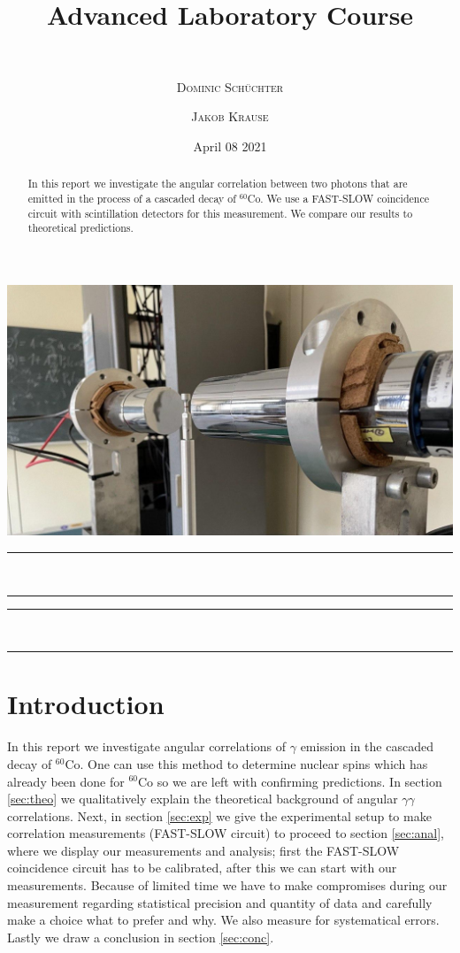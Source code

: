 \documentclass[11pt,a4paper,notitlepage]{scrartcl}
\title{ Advanced Laboratory Course}
\subtitle{\name  \\ \hrulefill}
\date{April 08 2021 \\}
\author[*]{\textsc{Dominic Schüchter}}
\author[$\dagger$]{\textsc{Jakob Krause}}
\affil[*]{\href{mailto:dschuechter@uni-bonn.de}{\faEnvelope  \hspace*{0.1cm}dschuechter@uni-bonn.de} {\color{black}$|$} \href{https://github.com/dschuechter}{\faGithub  \hspace*{0.1cm}dschuechter}}
\affil[$\dagger$]{\href{mailto:krause.jakob@uni-bonn.de}{\faEnvelope  \hspace*{0.1cm}krause.jakob@uni-bonn.de} {\color{black}$|$} \href{https://github.com/krausejm}{\faGithub  \hspace*{0.1cm}krausejm}}
\begin{document}
\maketitle
\vspace{-.8cm}
\thispagestyle{empty}
\begin{center}
\includegraphics[width=\linewidth]{titlepic}
\vspace{-.2cm}

\rule{12cm}{1pt} \\\vspace{-.6cm} \rule{10cm}{1pt}
\end{center}



\begin{abstract}
	In this report we investigate the angular correlation between two photons that are emitted in the process of a cascaded decay of $^{60}$Co. We use a FAST-SLOW coincidence circuit with scintillation detectors for this measurement. We compare our results to theoretical predictions.
\end{abstract}
\begin{center}
	 \rule{10cm}{1pt} \\\vspace{-.6cm} \rule{12cm}{1pt}
\end{center}

\setcounter{page}{-1}
\newpage

\tableofcontents
\thispagestyle{empty}
\newpage
\section{Introduction}
In this report we investigate angular correlations of $\gamma$ emission in the cascaded decay of $^{60}$Co. One can use this method to determine nuclear spins which has already been done for $^{60}$Co so we are left with confirming predictions. In section \ref{sec:theo} we qualitatively explain the theoretical background of angular $\gamma\gamma$ correlations. Next, in section \ref{sec:exp} we give the experimental setup to make correlation measurements (FAST-SLOW circuit) to proceed to section \ref{sec:anal}, where we display our measurements and analysis; first the FAST-SLOW coincidence circuit has to be calibrated, after this we can start with our measurements. Because of limited time we have to make compromises during our measurement regarding statistical precision and quantity of data and carefully make a choice what to prefer and why. We also measure for systematical errors. Lastly we draw a conclusion in section \ref{sec:conc}.
\end{document}
